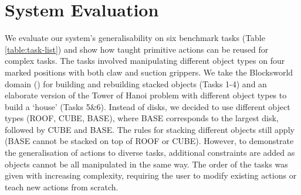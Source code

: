 \section{System Evaluation}
\label{sec:syseval}
We evaluate our system's generalisability on six benchmark tasks (Table \ref{table:task-list}) and show how taught primitive actions can be reused for complex tasks.
The tasks involved manipulating different object types on four marked positions with both claw and suction grippers.
We take the Blocksworld domain (\cite{slaney2001blocks}) for building and rebuilding stacked objects (Tasks 1-4) and an elaborate version of the Tower of Hanoi problem with different object types to build a `house' (Tasks 5\&6).
Instead of disks, we decided to use different object types (ROOF, CUBE, BASE), where BASE corresponds to the largest disk, followed by CUBE and BASE.
The rules for stacking different objects still apply (\eg BASE cannot be stacked on top of ROOF or CUBE).
However, to demonstrate the generalisation of actions to diverse tasks, additional constraints are added as objects cannot be all manipulated in the same way.
The order of the tasks was given with increasing complexity, requiring the user to modify existing actions or teach new actions from scratch.


